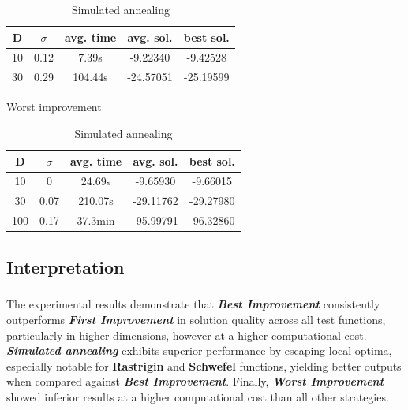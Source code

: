 \documentclass{article}
\begin{document}
\begin{table}[!htbp]
\begin{minipage}{.4\linewidth}
    \centering

    \begin{tabular}{|c|c|c|c|c|}
    \hline
    D   & $\sigma$  & avg. time     & avg. sol.     & best sol. \\
    \hline
    10  & 0.12      & 7.39s         & -9.22340      & -9.42528 \\
    \hline
    30  & 0.29      & 104.44s       & -24.57051     & -25.19599 \\
    \hline
    \end{tabular}
    \caption{Worst improvement}
  \end{minipage}%
  \quad %
  \begin{minipage}{.75\linewidth}
    \centering

    \begin{tabular}{|c|c|c|c|c|}
    \hline
    D   & $\sigma$  & avg. time     & avg. sol.     & best sol. \\
    \hline
    10  & 0         & 24.69s        & -9.65930      & -9.66015 \\
    \hline
    30  & 0.07      & 210.07s       & -29.11762     & -29.27980 \\
    \hline
    100 & 0.17      & 37.3min       & -95.99791     & -96.32860 \\
    \hline
    \end{tabular}
    \caption{Simulated annealing}
  \end{minipage}
\end{table}


\subsection{Interpretation}

\subparagraph{}
The experimental results demonstrate that \textit{\textbf{Best Improvement}} consistently outperforms \textit{\textbf{First Improvement}} in solution quality across all test functions, particularly in higher dimensions, however at a higher computational cost. \textit{\textbf{Simulated annealing}} exhibits superior performance by escaping local optima, especially notable for \textbf{Rastrigin} and \textbf{Schwefel} functions, yielding better outputs when compared against \textit{\textbf{Best Improvement}}. Finally, \textit{\textbf{Worst Improvement}} showed inferior results at a higher computational cost than all other strategies.
\end{document}
